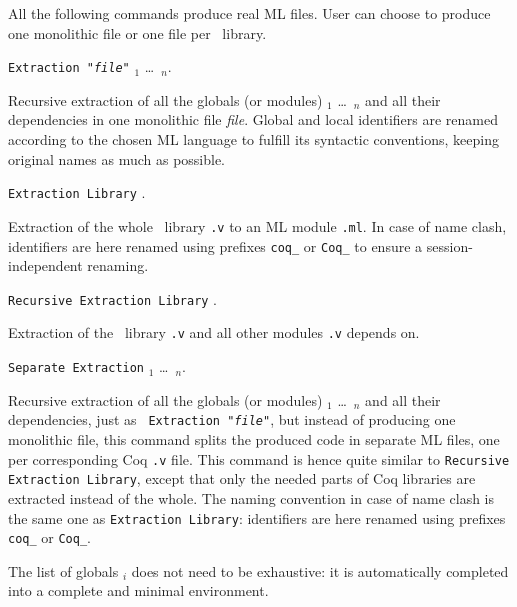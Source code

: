 
\noindent All the following commands produce real ML files. User can choose to produce
one monolithic file or one file per \Coq\ library. 

\begin{description}
\item {\tt Extraction "{\em file}"}  
      \qualid$_1$ \dots\ \qualid$_n$. ~\par
  Recursive extraction of all the globals (or modules) \qualid$_1$ \dots\
  \qualid$_n$ and all their dependencies in one monolithic file {\em file}.
  Global and local identifiers are renamed according to the chosen ML
  language to fulfill its syntactic conventions, keeping original
  names as much as possible.
  
\item {\tt Extraction Library} \ident. ~\par 
  Extraction of the whole \Coq\ library {\tt\ident.v} to an ML module
  {\tt\ident.ml}.  In case of name clash, identifiers are here renamed
  using prefixes \verb!coq_!  or \verb!Coq_! to ensure a
  session-independent renaming.

\item {\tt Recursive Extraction Library} \ident. ~\par
  Extraction of the \Coq\ library {\tt\ident.v} and all other modules 
  {\tt\ident.v} depends on. 

\item {\tt Separate Extraction}
      \qualid$_1$ \dots\ \qualid$_n$. ~\par
  Recursive extraction of all the globals (or modules) \qualid$_1$ \dots\
  \qualid$_n$ and all their dependencies, just as {\tt
    Extraction "{\em file}"}, but instead of producing one monolithic
  file, this command splits the produced code in separate ML files, one per
  corresponding Coq {\tt .v} file. This command is hence quite similar
  to {\tt Recursive Extraction Library}, except that only the needed
  parts of Coq libraries are extracted instead of the whole. The
  naming convention in case of name clash is the same one as
  {\tt Extraction Library}: identifiers are here renamed
  using prefixes \verb!coq_!  or \verb!Coq_!.
\end{description}

\noindent The list of globals \qualid$_i$ does not need to be
exhaustive: it is automatically completed into a complete and minimal
environment. 


